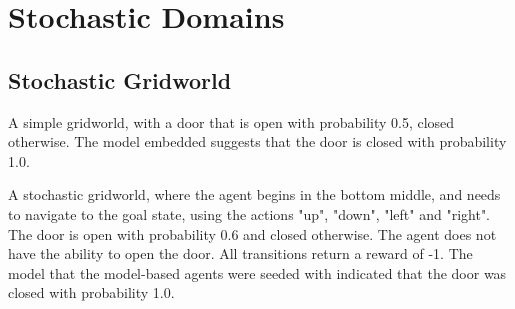 



\section{Stochastic Domains}


\subsection{Stochastic Gridworld}
A simple gridworld, with a door that is open with probability 0.5, closed otherwise. The model embedded suggests that the door is closed with probability 1.0.

A stochastic gridworld, where the agent begins in the bottom middle, and needs to navigate to the goal state, using the actions "up", "down", "left" and "right". The door is open with probability 0.6 and closed otherwise. The agent does not have the ability to open the door. All transitions return a reward of -1. The model that the model-based agents were seeded with indicated that the door was closed with probability 1.0.

